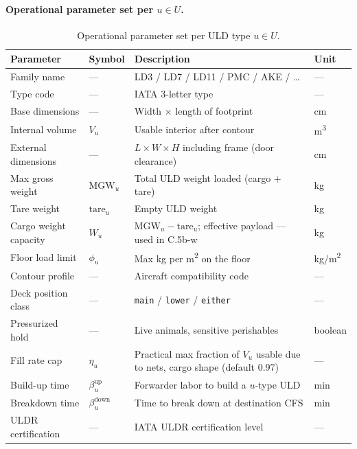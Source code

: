 \documentclass[11pt,a4paper]{article}
\theoremstyle{definition}
\begin{document}
\paragraph{Operational parameter set per $u \in U$.}
\begin{table}[H]
\centering
\caption{Operational parameter set per ULD type $u \in U$.}
\label{tab:uld-params}
\begin{tabular}{p{3cm}p{2.2cm}p{7cm}p{1.5cm}}
\toprule
Parameter & Symbol & Description & Unit \\
\midrule
Family name & --- & LD3 / LD7 / LD11 / PMC / AKE / \ldots & --- \\
Type code & --- & IATA 3-letter type & --- \\
Base dimensions & --- & Width $\times$ length of footprint & cm \\
Internal volume & $V_u$ & Usable interior after contour & m\textsuperscript{3} \\
External dimensions & --- & $L \times W \times H$ including frame (door clearance) & cm \\
Max gross weight & $\text{MGW}_u$ & Total ULD weight loaded (cargo + tare) & kg \\
Tare weight & $\text{tare}_u$ & Empty ULD weight & kg \\
Cargo weight capacity & $W_u$ & $\text{MGW}_u - \text{tare}_u$; effective payload --- used in C.5b-w & kg \\
Floor load limit & $\phi_u$ & Max kg per m\textsuperscript{2} on the floor & kg/m\textsuperscript{2} \\
Contour profile & --- & Aircraft compatibility code & --- \\
Deck position class & --- & \texttt{main} / \texttt{lower} / \texttt{either} & --- \\
Pressurized hold & --- & Live animals, sensitive perishables & boolean \\
Fill rate cap & $\eta_u$ & Practical max fraction of $V_u$ usable due to nets, cargo shape (default $0.97$) & --- \\
Build-up time & $\beta_u^{\text{up}}$ & Forwarder labor to build a $u$-type ULD & min \\
Breakdown time & $\beta_u^{\text{down}}$ & Time to break down at destination CFS & min \\
ULDR certification & --- & IATA ULDR certification level & --- \\
\bottomrule
\end{tabular}
\end{table}
\end{document}
